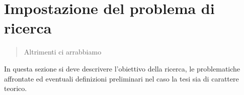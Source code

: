 \chapter{Impostazione del problema di ricerca}
\label{capitolo3}
\thispagestyle{empty}

\begin{quotation}
{\footnotesize
{}
\begin{flushright}
Altrimenti ci arrabbiamo
\end{flushright}
}
\end{quotation}
\vspace{0.5cm}

\noindent In questa sezione si deve descrivere l'obiettivo della ricerca, le problematiche affrontate ed eventuali definizioni preliminari nel caso la tesi sia di carattere teorico.